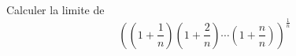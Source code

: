 Calculer la limite de
\begin{displaymath}
 \left( (1+\frac{1}{n})(1+\frac{2}{n})\cdots (1+\frac{n}{n})\right) ^{\frac{1}{n}}
\end{displaymath}
\bigskip